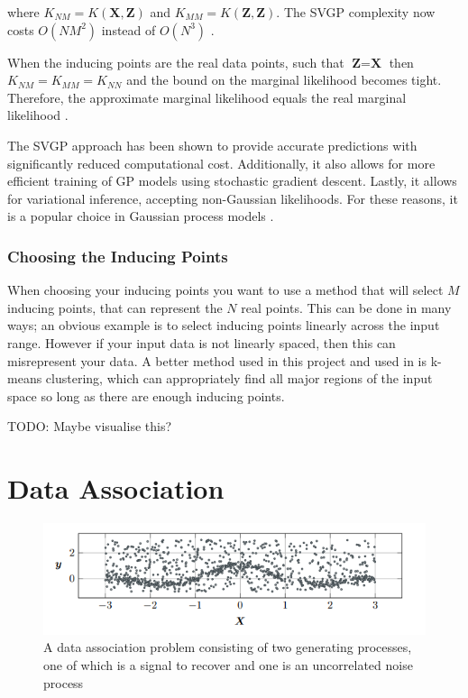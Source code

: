 \documentclass[12pt,a4paper]{report}
\theoremstyle{definition}
\begin{document}
where $K_{NM} = K(\textbf{X}, \textbf{Z})$ and $K_{MM} = K(\textbf{Z}, \textbf{Z})$.
The SVGP complexity now costs $O(NM^2)$ instead of $O(N^3)$ \citep{Lui2020}.

When the inducing points are the real data points, such that $\textbf{Z} = \textbf{X}$ then $K_{NM} = K_{MM} = K_{NN}$ and the bound on the marginal likelihood becomes tight. 
Therefore, the approximate marginal likelihood equals the real marginal likelihood \citep{Hensman2014}.

The SVGP approach has been shown to provide accurate predictions with significantly reduced computational cost. 
Additionally, it also allows for more efficient training of GP models using stochastic gradient descent.
Lastly, it allows for variational inference, accepting non-Gaussian likelihoods.
For these reasons, it is a popular choice in Gaussian process models \citep{SVGPYi2020}.

\subsubsection{Choosing the Inducing Points}

When choosing your inducing points you want to use a method that will select $M$ inducing points, that can represent the $N$ real points.
This can be done in many ways; an obvious example is to select inducing points linearly across the input range. 
However if your input data is not linearly spaced, then this can misrepresent your data.
A better method used in this project and used in \citet{Hensman2014} is k-means clustering, which can appropriately find all major regions of the input space so long as there are enough inducing points.

TODO: Maybe visualise this?

\section{Data Association}

\begin{figure}[H]
    \centering
    \includegraphics[width=\linewidth]{data_association_problem.png}
    \caption{A data association problem consisting of two generating processes, one of which is a signal to recover and one is an uncorrelated noise process \citep{Kaiser2018}}
    \label{fig:DataAssocProblem}
\end{figure}
\end{document}
